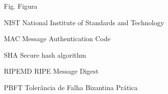 \begin{siglas}
  \item[Fig.] Figura
  \item[NIST] National Institute of Standards and Technology
  \item[MAC] Message Authentication Code
  \item[SHA] Secure hash algorithm
  \item[RIPEMD] RIPE Message Digest
  \item[PBFT] Tolerância de Falha Bizantina Prática
\end{siglas}
